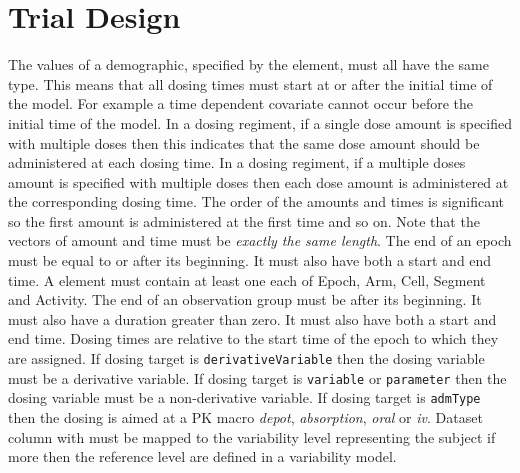 \section{Trial Design}

\begin{valrules}
 The values of a demographic,
specified by the  element, must all have the same
type.
 This
means that all dosing times must start at or after the initial time of
the model.
 For example a time dependent covariate cannot occur
before the initial time of the model.
 In a
dosing regiment, if a single dose amount is specified with multiple
doses then this indicates that the same dose amount should be
administered at each dosing time.
 In a
dosing regiment, if a multiple doses amount is specified with multiple
doses then each dose amount is administered at the corresponding
dosing time. The order of the amounts and times is significant so the
first amount is administered at the first time and so on. Note that
the vectors of amount and time must be \emph{exactly the same length}.
 The end of an epoch
must be equal to or after its beginning. It must also have both a start and end time.
 A 
element must contain at least one each of Epoch, Arm, Cell, Segment
and Activity.
 The end
of an observation group must be after its beginning. It must also have
a duration greater than zero. It must also have both a start and end
time.
 Dosing times are
relative to the start time of the epoch to which they are assigned.
 If dosing target is 
\texttt{derivativeVariable} then the dosing variable must be a
derivative variable.
 If dosing target is 
\texttt{variable} or \texttt{parameter} then the dosing variable must be a
non-derivative variable.
 If dosing target is \texttt{admType} 
then the dosing is aimed at a PK macro \emph{depot}, \emph{absorption}, 
\emph{oral} or \emph{iv}.
 Dataset column 
with  must be mapped to the variability level representing
the subject if more then the reference level are defined in a variability model.
%
\end{valrules}


